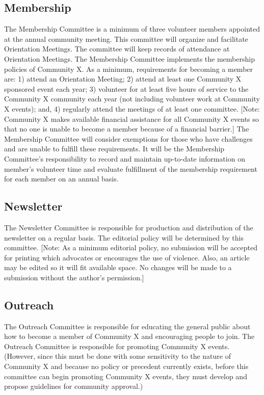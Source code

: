 \subsection*{Membership}
The Membership Committee is a minimum of three volunteer members appointed at the annual community meeting. This committee will organize and facilitate Orientation Meetings. The committee will keep records of attendance at Orientation Meetings. The Membership Committee implements the membership policies of Community X. As a minimum, requirements for becoming a member are: 1) attend an Orientation Meeting; 2) attend at least one Community X sponsored event each year; 3) volunteer for at least five hours of service to the Community X community each year (not including volunteer work at Community X events); and, 4) regularly attend the meetings of at least one committee. [Note: Community X makes available financial assistance for all Community X events so that no one is unable to become a member because of a financial barrier.] The Membership Committee will consider exemptions for those who have challenges and are unable to fulfill these requirements. It will be the Membership Committee's responsibility to record and maintain up-to-date information on member's volunteer time and evaluate fulfillment of the membership requirement for each member on an annual basis.


\subsection*{Newsletter}
The Newsletter Committee is responsible for production and distribution of the newsletter on a regular basis. The editorial policy will be determined by this committee. [Note: As a minimum editorial policy, no submission will be accepted for printing which advocates or encourages the use of violence. Also, an article may be edited so it will fit available space. No changes will be made to a submission without the author's permission.]


\subsection*{Outreach}
The Outreach Committee is responsible for educating the general public about how to become a member of Community X and encouraging people to join. The Outreach Committee is responsible for promoting Community X events. (However, since this must be done with some sensitivity to the nature of Community X and because no policy or precedent currently exists, before this committee can begin promoting Community X events, they must develop and propose guidelines for community approval.)


